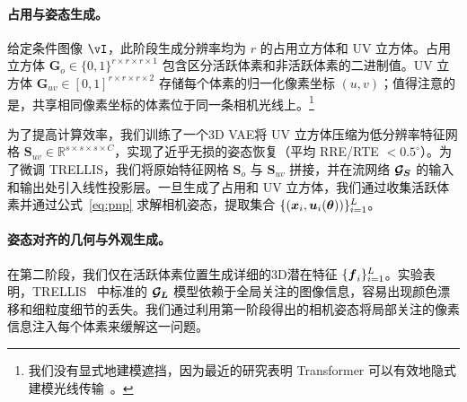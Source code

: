 \documentclass[../../book-main_zh.tex]{subfiles}
\begin{document}
\paragraph{占用与姿态生成。}
给定条件图像 \(\image\)，此阶段生成分辨率均为 $r$ 的占用立方体和 UV 立方体。占用立方体 \(\boldsymbol{G}_o \in \{0,1\}^{r \times r \times r \times 1}\) 包含区分活跃体素和非活跃体素的二进制值。UV 立方体 \(\boldsymbol{G}_{uv} \in [0,1]^{r \times r \times r \times 2}\) 存储每个体素的归一化像素坐标 $(u,v)$；值得注意的是，共享相同像素坐标的体素位于同一条相机光线上。\footnote{我们没有显式地建模遮挡，因为最近的研究表明 Transformer 可以有效地隐式建模光线传输~\citep{jin2024lvsm, zeng2025renderformer}。}

为了提高计算效率，我们训练了一个3D VAE将 UV 立方体压缩为低分辨率特征网格 \(\boldsymbol{S}_{uv} \in \mathbb{R}^{s\times s\times s \times C}\)，实现了近乎无损的姿态恢复（平均 RRE/RTE $< 0.5^\circ$）。为了微调 TRELLIS，我们将原始特征网格 \(\boldsymbol{S}_o\) 与 \(\boldsymbol{S}_{uv}\) 拼接，并在流网络 $\boldsymbol{\mathcal{G}_{S}}$ 的输入和输出处引入线性投影层。一旦生成了占用和 UV 立方体，我们通过收集活跃体素并通过公式~\ref{eq:pnp} 求解相机姿态，提取集合 $\{ (\boldsymbol{x}_i, \boldsymbol{u}_i(\boldsymbol{\theta})) \}_{i=1}^{L}$。



\paragraph{姿态对齐的几何与外观生成。}
在第二阶段，我们仅在活跃体素位置生成详细的3D潜在特征 $\{ \boldsymbol{f}_i \}_{i=1}^{L}$。实验表明，TRELLIS~\citep{xiang2025structured} 中标准的 $\boldsymbol{\mathcal{G}_{L}}$ 模型依赖于全局关注的图像信息，容易出现颜色漂移和细粒度细节的丢失。我们通过利用第一阶段得出的相机姿态将局部关注的像素信息注入每个体素来缓解这一问题。
\end{document}
